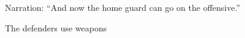 \documentclass[
  letterpaper,
  DIV=11,
  numbers=noendperiod]{scrartcl}
\begin{document}
\begin{figure}
\begin{minipage}[t]{0.50\linewidth}
{\centering 


\caption{\label{fig-weaver-ants-5}The defenders use weapons}

}

\end{minipage}%
\newline
\begin{minipage}[t]{0.50\linewidth}

{\centering 

Narration: ``And now the home guard can go on the offensive.''

}

\end{minipage}%
%
\begin{minipage}[t]{0.50\linewidth}

{\centering 

}
\end{minipage}
\end{figure}
\end{document}
